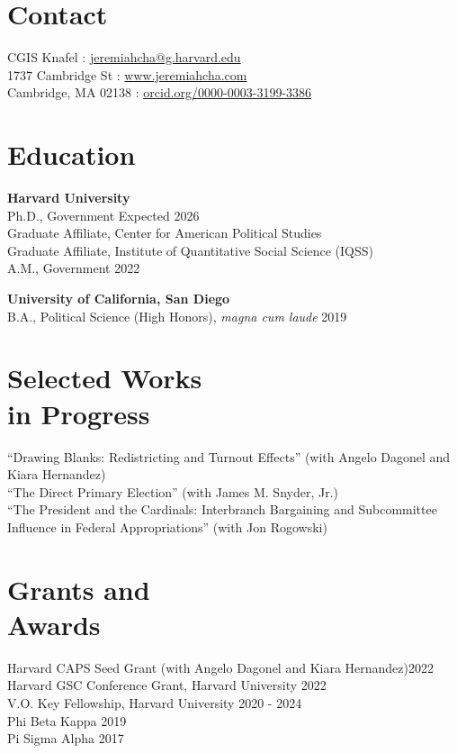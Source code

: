 \documentclass[margin, line]{res}
\begin{document}
\begin{resume}

\section{Contact}
CGIS Knafel \hfill \Letter: \href{mailto:jeremiahcha@g.harvard.edu}{jeremiahcha@g.harvard.edu}\\
1737 Cambridge St \hfill \Mundus: \href{httsp://www.jeremiahcha.com}{www.jeremiahcha.com}\\
Cambridge, MA 02138 \hfill \Mundus: \href{https://orcid.org/0000-0003-3199-3386}{orcid.org/0000-0003-3199-3386}

\section{Education}
\textbf{Harvard University}\\
\hspace*{5mm} Ph.D., Government \hfill Expected 2026\\
\hspace*{10mm}Graduate Affiliate, Center for American Political Studies\\
\hspace*{10mm}Graduate Affiliate, Institute of Quantitative Social Science (IQSS)\\
\hspace*{5mm} A.M., Government \hfill 2022

\textbf{University of California, San Diego}\\
\hspace*{5mm} B.A., Political Science (High Honors), \textit{magna cum laude} \hfill 2019

\section{Selected Works \\in Progress}
``Drawing Blanks: Redistricting and Turnout Effects'' (with Angelo Dagonel and Kiara Hernandez)\\
``The Direct Primary Election'' (with James M. Snyder, Jr.)\\
``The President and the Cardinals: Interbranch Bargaining and Subcommittee Influence in Federal Appropriations'' (with Jon Rogowski)


\section{Grants and \\Awards}
Harvard CAPS Seed Grant (with Angelo Dagonel and Kiara Hernandez)\hfill 2022\\
Harvard GSC Conference Grant, Harvard University \hfill 2022\\
V.O. Key Fellowship, Harvard University \hfill 2020 - 2024\\
Phi Beta Kappa \hfill 2019\\
Pi Sigma Alpha \hfill 2017


\end{resume}
\end{document}
